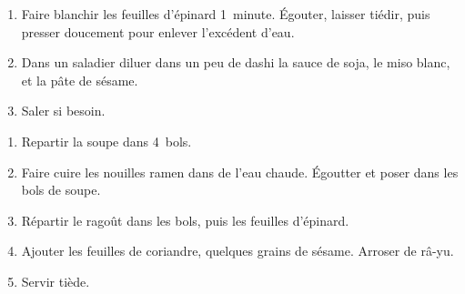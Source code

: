 \begin{recipe}
  \begin{enumerate}

  \item Faire blanchir les feuilles d'épinard 1~minute.  Égouter,
    laisser tiédir, puis presser doucement pour enlever l'excédent
    d'eau.

  \item Dans un saladier diluer dans un peu de dashi la sauce de soja,
    le miso blanc, et la pâte de sésame.

  \item Saler si besoin.

  \end{enumerate}
\end{recipe}



\begin{ingredients}
\end{ingredients}


\begin{recipe}
  \begin{enumerate}

  \item Repartir la soupe dans 4~bols.

  \item Faire cuire les nouilles ramen dans de l'eau chaude.  Égoutter
    et poser dans les bols de soupe.

  \item Répartir le ragoût dans les bols, puis les feuilles d'épinard.

  \item Ajouter les feuilles de coriandre, quelques grains de sésame.
    Arroser de râ-yu.

  \item Servir tiède.

  \end{enumerate}
\end{recipe}

